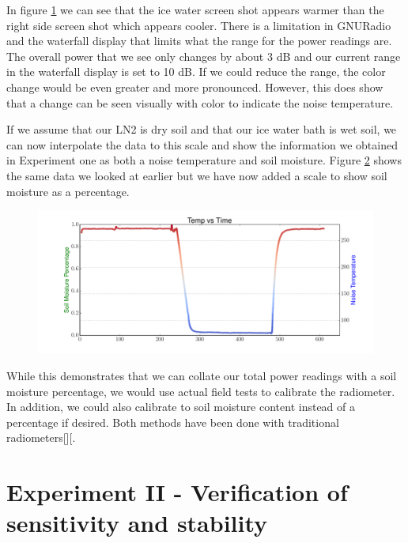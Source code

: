 {\begin{figure}[h!tb]
\label{side_waterfall}
\end{figure}

In figure \ref{side_waterfall} we can see that the ice water screen shot appears warmer than the right side screen shot which appears cooler.  There is a limitation in GNURadio and the waterfall display that limits what the range for the power readings are.  The overall power that we see only changes by about 3 dB and our current range in the waterfall display is set to 10 dB.  If we could reduce the range, the color change would be even greater and more pronounced.  However, this does show that a change can be seen visually with color to indicate the noise temperature.  

If we assume that our LN2 is dry soil and that our ice water bath is wet soil, we can now interpolate the data to this scale and show the information we obtained in Experiment one as both a noise temperature and soil moisture.  Figure \ref{SDR_soil} shows the same data we looked at earlier but we have now added a scale to show soil moisture as a percentage.

\begin{figure}[h!tb] \centering

\includegraphics[width=\textwidth]{Experiments/Exp1/sdr_soilmoisture.pdf}
\label{SDR_soil}
\end{figure}

While this demonstrates that we can collate our total power readings with a soil moisture percentage, we would use actual field tests to calibrate the radiometer.  In addition, we could also calibrate to soil moisture content instead of a percentage if desired.  Both methods have been done with traditional radiometers[\cite{Jonard}][\cite{Shi}.

\section{Experiment II - Verification of sensitivity and stability} \label{Exp1_results}

}
